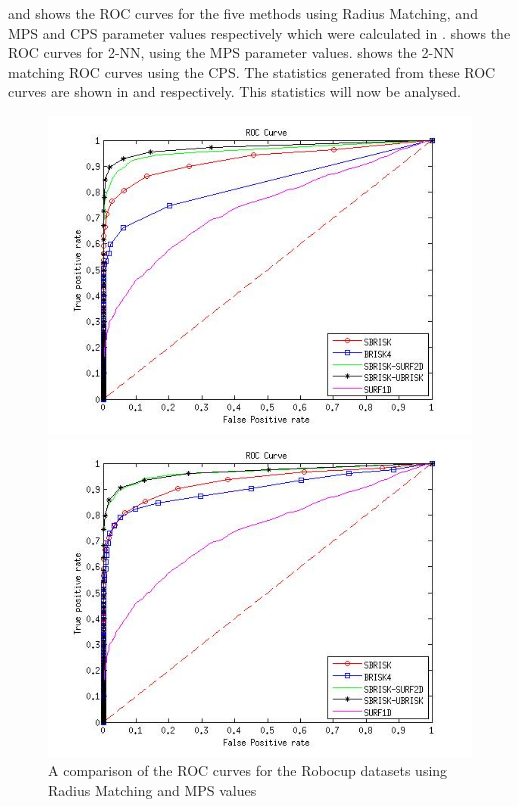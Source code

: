 \documentclass{report}
\begin{document}
 and  shows the ROC curves for the five methods using Radius Matching, and MPS and CPS parameter values respectively which were calculated in .  shows the ROC curves for 2-NN, using the MPS parameter values.  shows the 2-NN matching ROC curves using the CPS. The statistics generated from these ROC curves are shown in  and  respectively. This statistics will now be analysed.\\

\begin{figure}[h!]
\begin{minipage}[b]{0.5\linewidth}
\includegraphics[scale=0.4]{../Drawings/RobocupDataset/ROC_General_Hamming_max.jpg}
\caption{A comparison of the ROC curves for the Robocup datasets using Radius Matching and MPS values}
\label{fig:compareHamming}
\end{minipage}
\hspace{0.5cm}
\begin{minipage}[b]{0.5\linewidth}
\includegraphics[scale=0.4]{../Drawings/RobocupDataset/ROC_General_Hamming_consistent.jpg}

\end{minipage}
\end{figure}
\end{document}
